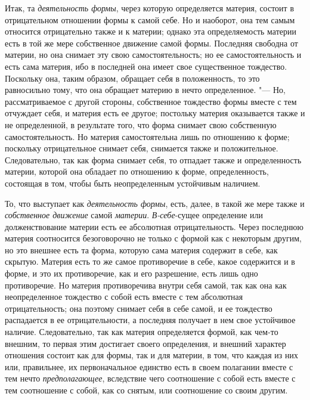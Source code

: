 Итак, та {\em деятельность формы}, через которую
определяется материя, состоит в отрицательном отношении формы к самой себе.
Но и наоборот, она тем самым относится отрицательно также и к материи;
однако эта определяемость материи есть в той же мере собственное движение
самой формы. Последняя свободна от материи, но она снимает эту свою
самостоятельность; но ее самостоятельность и есть сама материя, ибо в
последней она имеет свое существенное тождество. Поскольку она, таким
образом, обращает себя в положенность, то это равносильно тому, что она
обращает материю в нечто определенное. "--- Но, рассматриваемое с другой
стороны, собственное тождество формы вместе с тем отчуждает себя, и материя
есть ее другое; постольку материя оказывается также и не определенной, в
результате того, что форма снимает свою собственную самостоятельность. Но
материя самостоятельна лишь по отношению к форме; поскольку отрицательное
снимает себя, снимается также и положительное. Следовательно, так как форма
снимает себя, то отпадает также и определенность материи, которой она
обладает по отношению к форме, определенность, состоящая в том, чтобы быть
неопределенным устойчивым наличием.

То, что выступает как {\em деятельность формы}, есть,
далее, в такой же мере также и {\em собственное
движение} самой {\em материи}.
{\em В-себе}{}-сущее определение или долженствование
материи есть ее абсолютная отрицательность. Через последнюю материя
соотносится безоговорочно не только с формой как с некоторым другим, но это
внешнее есть та форма, которую сама материя содержит в себе, как скрытую.
Материя есть то же самое противоречие в себе, какое содержится и в форме, и
это их противоречие, как и его разрешение, есть лишь одно противоречие. Но
материя противоречива внутри себя самой, так как она как неопределенное
тождество с собой есть вместе с тем абсолютная отрицательность; она поэтому
снимает себя в себе самой, и ее тождество распадается в ее отрицательности,
а последняя получает в нем свое устойчивое наличие. Следовательно, так как
материя определяется формой, как чем-то внешним, то первая этим достигает
своего определения, и внешний характер отношения состоит как для формы, так
и для материи, в том, что каждая из них или, правильнее, их первоначальное
единство есть в своем полагании вместе с тем нечто
{\em предполагающее}, вследствие чего соотношение с
собой есть вместе с тем соотношение с собой, как со снятым, или соотношение
со своим другим.

